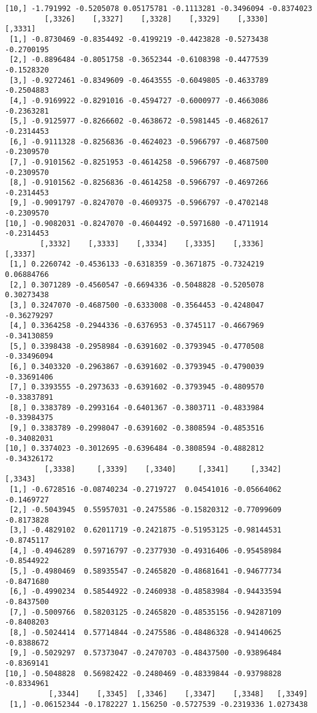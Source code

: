 \documentclass[
  letterpaper,
  DIV=11,
  numbers=noendperiod]{scrreprt}
\begin{document}
\begin{verbatim}
[10,] -1.791992 -0.5205078 0.05175781 -0.1113281 -0.3496094 -0.8374023
         [,3326]    [,3327]    [,3328]    [,3329]    [,3330]    [,3331]
 [1,] -0.8730469 -0.8354492 -0.4199219 -0.4423828 -0.5273438 -0.2700195
 [2,] -0.8896484 -0.8051758 -0.3652344 -0.6108398 -0.4477539 -0.1528320
 [3,] -0.9272461 -0.8349609 -0.4643555 -0.6049805 -0.4633789 -0.2504883
 [4,] -0.9169922 -0.8291016 -0.4594727 -0.6000977 -0.4663086 -0.2363281
 [5,] -0.9125977 -0.8266602 -0.4638672 -0.5981445 -0.4682617 -0.2314453
 [6,] -0.9111328 -0.8256836 -0.4624023 -0.5966797 -0.4687500 -0.2309570
 [7,] -0.9101562 -0.8251953 -0.4614258 -0.5966797 -0.4687500 -0.2309570
 [8,] -0.9101562 -0.8256836 -0.4614258 -0.5966797 -0.4697266 -0.2314453
 [9,] -0.9091797 -0.8247070 -0.4609375 -0.5966797 -0.4702148 -0.2309570
[10,] -0.9082031 -0.8247070 -0.4604492 -0.5971680 -0.4711914 -0.2314453
        [,3332]    [,3333]    [,3334]    [,3335]    [,3336]     [,3337]
 [1,] 0.2260742 -0.4536133 -0.6318359 -0.3671875 -0.7324219  0.06884766
 [2,] 0.3071289 -0.4560547 -0.6694336 -0.5048828 -0.5205078  0.30273438
 [3,] 0.3247070 -0.4687500 -0.6333008 -0.3564453 -0.4248047 -0.36279297
 [4,] 0.3364258 -0.2944336 -0.6376953 -0.3745117 -0.4667969 -0.34130859
 [5,] 0.3398438 -0.2958984 -0.6391602 -0.3793945 -0.4770508 -0.33496094
 [6,] 0.3403320 -0.2963867 -0.6391602 -0.3793945 -0.4790039 -0.33691406
 [7,] 0.3393555 -0.2973633 -0.6391602 -0.3793945 -0.4809570 -0.33837891
 [8,] 0.3383789 -0.2993164 -0.6401367 -0.3803711 -0.4833984 -0.33984375
 [9,] 0.3383789 -0.2998047 -0.6391602 -0.3808594 -0.4853516 -0.34082031
[10,] 0.3374023 -0.3012695 -0.6396484 -0.3808594 -0.4882812 -0.34326172
         [,3338]     [,3339]    [,3340]     [,3341]     [,3342]    [,3343]
 [1,] -0.6728516 -0.08740234 -0.2719727  0.04541016 -0.05664062 -0.1469727
 [2,] -0.5043945  0.55957031 -0.2475586 -0.15820312 -0.77099609 -0.8173828
 [3,] -0.4829102  0.62011719 -0.2421875 -0.51953125 -0.98144531 -0.8745117
 [4,] -0.4946289  0.59716797 -0.2377930 -0.49316406 -0.95458984 -0.8544922
 [5,] -0.4980469  0.58935547 -0.2465820 -0.48681641 -0.94677734 -0.8471680
 [6,] -0.4990234  0.58544922 -0.2460938 -0.48583984 -0.94433594 -0.8437500
 [7,] -0.5009766  0.58203125 -0.2465820 -0.48535156 -0.94287109 -0.8408203
 [8,] -0.5024414  0.57714844 -0.2475586 -0.48486328 -0.94140625 -0.8388672
 [9,] -0.5029297  0.57373047 -0.2470703 -0.48437500 -0.93896484 -0.8369141
[10,] -0.5048828  0.56982422 -0.2480469 -0.48339844 -0.93798828 -0.8334961
          [,3344]    [,3345]  [,3346]    [,3347]    [,3348]   [,3349]
 [1,] -0.06152344 -0.1782227 1.156250 -0.5727539 -0.2319336 1.0273438

\end{verbatim}
\end{document}
